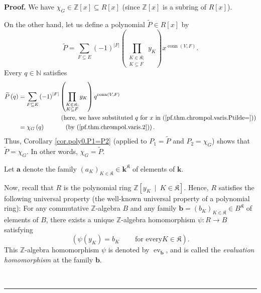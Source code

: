 \documentclass[numbers=enddot,12pt,final,onecolumn,notitlepage]{scrartcl}%
\theoremstyle{definition}
\newenvironment{proof}[1][Proof]{\noindent\textbf{#1.} }{\ \rule{0.5em}{0.5em}}
\newenvironment{verlong}{}{}
\let\sumnonlimits\sum
\let\prodnonlimits\prod
\renewcommand{\sum}{\sumnonlimits\limits}
\renewcommand{\prod}{\prodnonlimits\limits}
\begin{document}
\begin{verlong}
\begin{proof}
We have $\chi_{G}\in\mathbb{Z}\left[  x\right]  \subseteq R\left[  x\right]  $
(since $\mathbb{Z}\left[  x\right]  $ is a subring of $R\left[  x\right]  $).

On the other hand, let us define a polynomial $\widetilde{P}\in R\left[
x\right]  $ by%
\begin{equation}
\widetilde{P}=\sum_{F\subseteq E}\left(  -1\right)  ^{\left\vert F\right\vert
}\left(  \prod_{\substack{K\in\mathfrak{K};\\K\subseteq F}}y_{K}\right)
x^{\operatorname*{conn}\left(  V,F\right)  }.
\label{pf.thm.chrompol.varis.Ptilde=}%
\end{equation}
Every $q\in\mathbb{N}$ satisfies%
\begin{align}
\widetilde{P}\left(  q\right)   &  =\sum_{F\subseteq E}\left(  -1\right)
^{\left\vert F\right\vert }\left(  \prod_{\substack{K\in\mathfrak{K}%
;\\K\subseteq F}}y_{K}\right)  q^{\operatorname*{conn}\left(  V,F\right)
}\nonumber\\
&  \ \ \ \ \ \ \ \ \ \ \ \ \ \ \ \ \ \ \ \ \left(  \text{here, we have
substituted }q\text{ for }x\text{ in (\ref{pf.thm.chrompol.varis.Ptilde=}%
)}\right) \nonumber\\
&  =\chi_{G}\left(  q\right)  \ \ \ \ \ \ \ \ \ \ \left(  \text{by
(\ref{pf.thm.chrompol.varis.2})}\right)  .
\label{pf.thm.chrompol.varis.Ptildeq=}%
\end{align}
Thus, Corollary \ref{cor.poly0.P1=P2} (applied to $P_{1}=\widetilde{P}$ and
$P_{2}=\chi_{G}$) shows that $\widetilde{P}=\chi_{G}$. In other words,
$\chi_{G}=\widetilde{P}$.

Let $\mathbf{a}$ denote the family $\left(  a_{K}\right)  _{K\in\mathfrak{K}%
}\in\mathbf{k}^{\mathfrak{K}}$ of elements of $\mathbf{k}$.

Now, recall that $R$ is the polynomial ring $\mathbb{Z}\left[  y_{K}%
\ \mid\ K\in\mathfrak{K}\right]  $. Hence, $R$ satisfies the following
universal property (the well-known universal property of a polynomial ring):
For any commutative $\mathbb{Z}$-algebra $B$ and any family $\mathbf{b}%
=\left(  b_{K}\right)  _{K\in\mathfrak{K}}\in B^{\mathfrak{K}}$ of elements of
$B$, there exists a unique $\mathbb{Z}$-algebra homomorphism $\psi
:R\rightarrow B$ satisfying%
\[
\left(  \psi\left(  y_{K}\right)  =b_{K}\ \ \ \ \ \ \ \ \ \ \text{for every
}K\in\mathfrak{K}\right)  .
\]
This $\mathbb{Z}$-algebra homomorphism $\psi$ is denoted by
$\operatorname*{ev}\nolimits_{\mathbf{b}}$, and is called the \emph{evaluation
homomorphism} at the family $\mathbf{b}$.


\end{proof}
\end{verlong}
\end{document}
